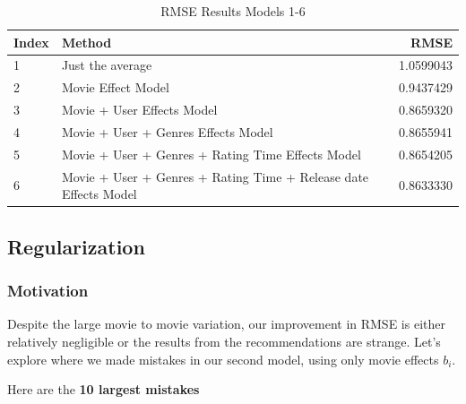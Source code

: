 \documentclass[
]{article}
\begin{document}
\begin{table}[H]

\caption{\label{tab:rde_4}RMSE Results Models 1-6\label{tbl:rmse_results_model_1-6}}
\centering
\fontsize{7}{9}\selectfont
\begin{tabular}[t]{llr}
\toprule
Index & Method & RMSE\\
\midrule
1 & Just the average & 1.0599043\\
2 & Movie Effect Model & 0.9437429\\
3 & Movie + User Effects Model & 0.8659320\\
4 & Movie + User + Genres Effects Model & 0.8655941\\
5 & Movie + User + Genres + Rating Time Effects Model & 0.8654205\\
6 & Movie + User + Genres + Rating Time + Release date Effects Model & 0.8633330\\
\bottomrule
\end{tabular}
\end{table}

\newpage

\hypertarget{regularization}{%
\subsection{Regularization}\label{regularization}}

\hypertarget{motivation}{%
\subsubsection{Motivation}\label{motivation}}

Despite the large movie to movie variation, our improvement in RMSE is
either relatively negligible or the results from the recommendations are
strange. Let's explore where we made mistakes in our second model, using
only movie effects \(b_{i}\).

Here are the \textbf{10 largest mistakes}
\end{document}
